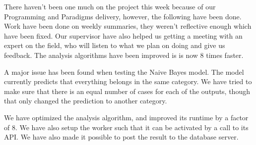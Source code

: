 There haven’t been one much on the project this week because of our Programming and Paradigms delivery, however, the following have been done.
Work have been done on weekly summaries, they weren’t reflective enough which have been fixed. 
Our supervisor have also helped us getting a meeting with an expert on the field, who will listen to what we plan on doing and give us feedback.
The analysis algorithms have been improved is is now 8 times faster.


A major issue has been found when testing the Naive Bayes model. The model currently predicts that everything belongs in the same category. We have tried to make sure that there is an equal number of cases for each of the outputs, though that only changed the prediction to another category. 

We have optimized the analysis algorithm, and improved its runtime by a factor of 8. We have also setup the worker such that it can be activated by a call to its API. We have also made it possible to post the result to the database server. 
